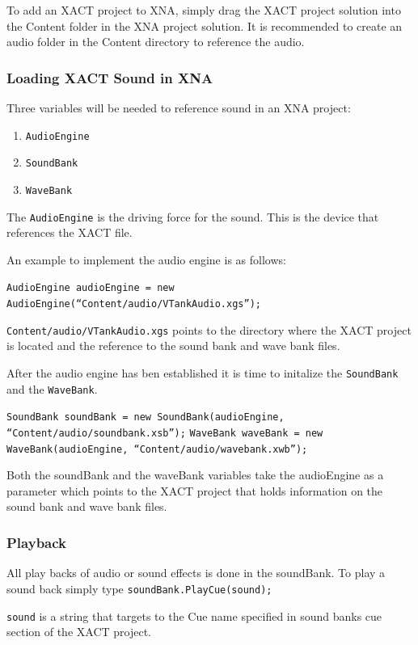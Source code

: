 To add an XACT project to XNA, simply drag the XACT project solution into the Content folder in the XNA project solution. It is recommended to create an audio folder in the Content directory to reference the audio.

\subsubsection{Loading XACT Sound in XNA}

Three variables will be needed to reference sound in an XNA project:

\begin{enumerate}
\item \texttt{AudioEngine}
\item \texttt{SoundBank}
\item \texttt{WaveBank}
\end{enumerate}

The \texttt{AudioEngine} is the driving force for the sound. This is the device that references the XACT file.

An example to implement the audio engine is as follows:

\texttt{AudioEngine audioEngine = new AudioEngine(``Content/audio/VTankAudio.xgs'');}

\texttt{Content/audio/VTankAudio.xgs} points to the directory where the XACT project is located and the reference to the sound bank and wave bank files.

After the audio engine has ben established it is time to initalize the \texttt{SoundBank} and the \texttt{WaveBank}.

\texttt{SoundBank soundBank = new SoundBank(audioEngine, ``Content/audio/soundbank.xsb'');}
\texttt{WaveBank waveBank = new WaveBank(audioEngine, ``Content/audio/wavebank.xwb'');}

Both the soundBank and the waveBank variables take the audioEngine as a parameter which points to the XACT project that holds information on the sound bank and wave bank files.

\subsubsection{Playback}

All play backs of audio or sound effects is done in the soundBank. To play a sound back simply type \texttt{soundBank.PlayCue(sound);}

\texttt{sound} is a string that targets to the Cue name specified in sound banks cue section of the XACT project.


